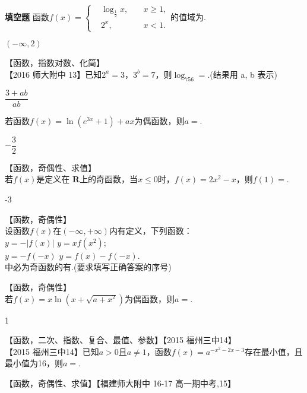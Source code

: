 \begin{exercise}{\bf 填空题}
       函数$f(x)=\left\{\begin{aligned}
       &\log_{\frac12}x,\quad &x\geqslant1,\\
       &2^x,\quad &x<1.
       \end{aligned}\right.$的值域为\tk.
       \begin{answer}
         $(-\infty,2)$
       \end{answer}
    \item 【函数，指数对数、化简】\\
      【2016 师大附中 13】已知$2^a=3 $，$3^b=7$，则$\log_756= $\tk.(结果用 a, b 表示)
      \begin{answer}
        $\dfrac{3+ab}{ab}$
      \end{answer}\item
        若函数$f(x)=\ln (e^{3x}+1)+ax$为偶函数，则$ a= $\tk.
        \begin{answer}
          $-\dfrac{3}2$
        \end{answer}
    \item【函数，奇偶性、求值】\\
      若$f(x)$是定义在 $\mathbf{R} $上的奇函数，当$ x\le0 $时，$f(x)=2x^2-x$，则$f(1)=$\tk.
      \begin{answer}
        -3
      \end{answer}
    \item【函数，奇偶性】\\
      设函数$f(x)$在$ \left(-\infty,+\infty\right) $内有定义，下列函数：\\
       $ y=-\left|f(x)\right| $\qquad{} $ y=xf(x^2) $;\\
       $ y=-f(-x) $\qquad {} $ y=f(x)-f(-x) $.\\
      中必为奇函数的有\tk.(要求填写正确答案的序号)
      \begin{answer}
      \end{answer}
    \item 【函数，奇偶性】\\
      若$f(x)=x\ln (x+\sqrt{a+x^2})$为偶函数，则$ a= $\tk.
      \begin{answer}
        1
      \end{answer}
    \item 【函数，二次、指数、复合、最值、参数】【2015 福州三中14】\\
      【2015 福州三中14】已知$a>0$且$a\neq1$，函数$f(x)=a^{-x^2-2x-3}$存在最小值，且最小值为16，则$a=$\tk.
    \item 【函数，奇偶性、求值】【福建师大附中 16-17 高一期中考,15】\\

\end{exercise}
